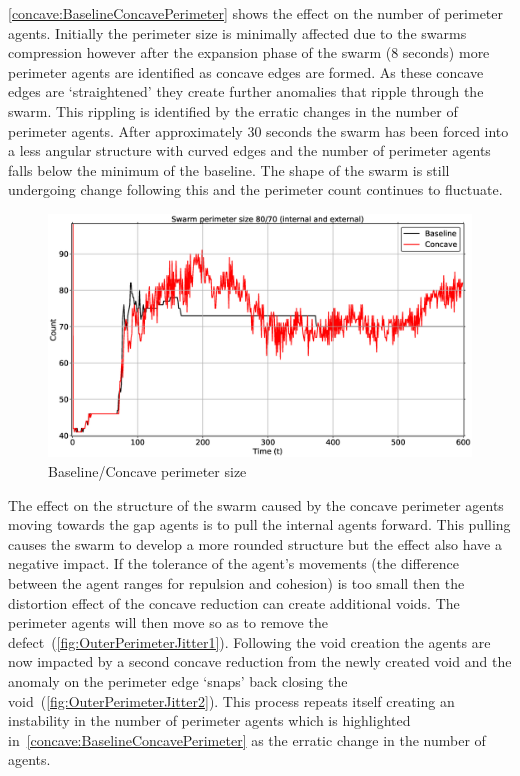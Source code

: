 \autoref{concave:BaselineConcavePerimeter} shows the effect on the number of perimeter agents. Initially the perimeter size is minimally affected due to the swarms compression however after the expansion phase of the swarm (8 seconds) more perimeter agents are identified as concave edges are formed. As these concave edges are `straightened' they create further anomalies that ripple through the swarm. This rippling is identified by the erratic changes in the number of perimeter agents. After approximately 30 seconds the swarm has been forced into a less angular structure with curved edges and the number of perimeter agents falls below the minimum of the baseline. The shape of the swarm is still undergoing change following this and the perimeter count continues to fluctuate.
\begin{figure}[H]
\begin{center}
\includegraphics[width=14cm]{CHAPTER-7/figures/BaselineConcavePerimeter}
\end{center}
\caption{Baseline/Concave perimeter size\label{concave:BaselineConcavePerimeter}}
\end{figure}

The effect on the structure of the swarm caused by the concave perimeter agents moving towards the gap agents is to pull the internal agents forward. This pulling causes the swarm to develop a more rounded structure but the effect also have a negative impact. If the tolerance of the agent's movements (the difference between the agent ranges for repulsion and cohesion) is too small then the distortion effect of the concave reduction can create additional voids. The perimeter agents will then move so as to remove the defect~(\autoref{fig:OuterPerimeterJitter1}). Following the void creation the agents are now impacted by a second concave reduction from the newly created void and the anomaly on the perimeter edge `snaps' back closing the void~(\autoref{fig:OuterPerimeterJitter2}). This process repeats itself creating an instability in the number of perimeter agents which is highlighted in~\autoref{concave:BaselineConcavePerimeter} as the erratic change in the number of agents. 

